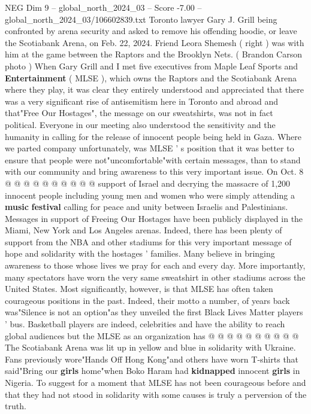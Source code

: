 \begin{textsample}{NEG Dim 9 – global\_north\_2024\_03 – Score -7.00 – global\_north\_2024\_03/106602839.txt}  \label{ex:f9_neg_243}
Toronto lawyer Gary J.
Grill being confronted by arena security and asked to remove his offending hoodie, or leave the Scotiabank Arena, on Feb. 22, 2024.
Friend Leora Shemesh ( right ) was with him at the game between the Raptors and the Brooklyn Nets. ( Brandon Carson photo ) When Gary Grill and I met five executives from Maple Leaf Sports and \textbf{Entertainment} ( MLSE ), which owns the Raptors and the Scotiabank Arena where they play, it was clear they entirely understood and appreciated that there was a very significant rise of antisemitism here in Toronto and abroad and that"Free Our Hostages", the message on our sweatshirts, was not in fact political.
Everyone in our meeting also understood the sensitivity and the humanity in calling for the release of innocent people being held in Gaza.
Where we parted company unfortunately, was MLSE ' s position that it was better to ensure that people were not"uncomfortable"with certain messages, than to stand with our community and bring awareness to this very important issue.
On Oct. 8 @ @ @ @ @ @ @ @ @ @ support of Israel and decrying the massacre of 1,200 innocent people including young men and women who were simply attending a \textbf{music} \textbf{festival} calling for peace and unity between Israelis and Palestinians.
Messages in support of Freeing Our Hostages have been publicly displayed in the Miami, New York and Los Angeles arenas.
Indeed, there has been plenty of support from the NBA and other stadiums for this very important message of hope and solidarity with the hostages ' families.
Many believe in bringing awareness to those whose lives we pray for each and every day.
More importantly, many spectators have worn the very same sweatshirt in other stadiums across the United States.
Most significantly, however, is that MLSE has often taken courageous positions in the past.
Indeed, their motto a number, of years back was"Silence is not an option"as they unveiled the first Black Lives Matter players ' bus.
Basketball players are indeed, celebrities and have the ability to reach global audiences but the MLSE as an organization has @ @ @ @ @ @ @ @ @ @ The Scotiabank Arena was lit up in yellow and blue in solidarity with Ukraine.
Fans previously wore"Hands Off Hong Kong"and others have worn T-shirts that said"Bring our \textbf{girls} home"when Boko Haram had \textbf{kidnapped} innocent \textbf{girls} in Nigeria.
To suggest for a moment that MLSE has not been courageous before and that they had not stood in solidarity with some causes is truly a perversion of the truth.

\end{textsample}
